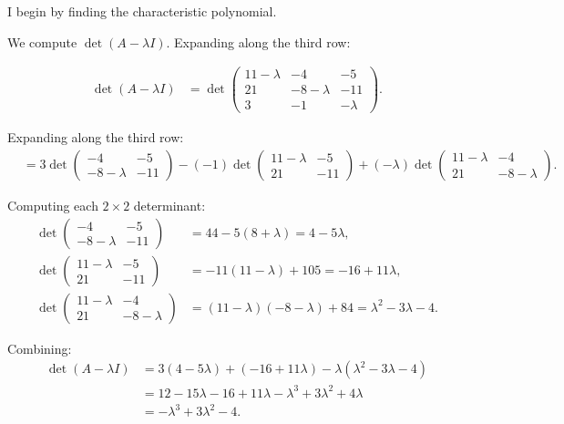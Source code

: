 \documentclass{article}
\begin{document}
\begin{mdframed}[linewidth=1pt]
\textnormal{I begin by finding the characteristic polynomial.}

We compute $\det(A - \lambda I)$. Expanding along the third row:

\begin{align*}
\det(A - \lambda I) &= \det\begin{pmatrix} 11-\lambda & -4 & -5 \\ 21 & -8-\lambda & -11 \\ 3 & -1 & -\lambda \end{pmatrix}.
\end{align*}

Expanding along the third row:
\begin{align*}
&= 3\det\begin{pmatrix} -4 & -5 \\ -8-\lambda & -11 \end{pmatrix} - (-1)\det\begin{pmatrix} 11-\lambda & -5 \\ 21 & -11 \end{pmatrix} + (-\lambda)\det\begin{pmatrix} 11-\lambda & -4 \\ 21 & -8-\lambda \end{pmatrix}.
\end{align*}

Computing each $2 \times 2$ determinant:
\begin{align*}
\det\begin{pmatrix} -4 & -5 \\ -8-\lambda & -11 \end{pmatrix} &= 44 - 5(8+\lambda) = 4 - 5\lambda, \\
\det\begin{pmatrix} 11-\lambda & -5 \\ 21 & -11 \end{pmatrix} &= -11(11-\lambda) + 105 = -16 + 11\lambda, \\
\det\begin{pmatrix} 11-\lambda & -4 \\ 21 & -8-\lambda \end{pmatrix} &= (11-\lambda)(-8-\lambda) + 84 = \lambda^2 - 3\lambda - 4.
\end{align*}

Combining:
\begin{align*}
\det(A - \lambda I) &= 3(4 - 5\lambda) + (-16 + 11\lambda) - \lambda(\lambda^2 - 3\lambda - 4) \\
&= 12 - 15\lambda - 16 + 11\lambda - \lambda^3 + 3\lambda^2 + 4\lambda \\
&= -\lambda^3 + 3\lambda^2 - 4.
\end{align*}


\end{mdframed}
\end{document}

